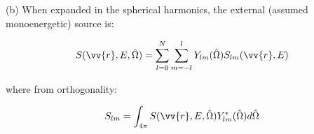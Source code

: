 \documentclass[10pt]{article}
\begin{document}

\clearpage
(b) When expanded in the spherical harmonics, the external (assumed monoenergetic) source is:

\begin{equation}
\label{eq:12}
S(\vv{r},E,\hat{\Omega})=\sum_{l=0}^{N}\sum_{m=-l}^{l}Y_{lm}(\hat{\Omega})S_{lm}(\vv{r},E)
\end{equation}

where from orthogonality:

\begin{equation}
\label{eq:121}
S_{lm}=\int_{4\pi}^{}S(\vv{r},E,\hat{\Omega})Y_{lm}^{*}(\hat{\Omega})d\hat{\Omega}
\end{equation}
\end{document}
